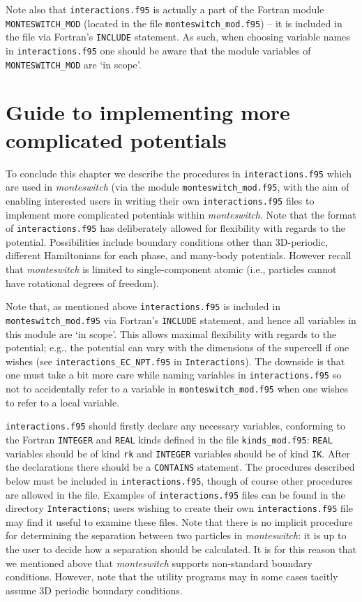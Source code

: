 \documentclass{report}
\begin{document}
Note also that \texttt{interactions.f95} is actually a part of the Fortran module \verb|MONTESWITCH_MOD| (located in the file 
\texttt{monteswitch\_mod.f95}) -- it is included in the file via Fortran's \verb|INCLUDE| statement. As such, when choosing variable names
in \texttt{interactions.f95} one should be aware that the module variables of \verb|MONTESWITCH_MOD| are `in scope'.


\section{Guide to implementing more complicated potentials}
To conclude this chapter we describe the procedures in \texttt{interactions.f95} which are used in \emph{monteswitch} (via the module
\texttt{monteswitch\_mod.f95}, with the aim of enabling interested users in writing their own \texttt{interactions.f95} files to implement
more complicated potentials within \emph{monteswitch}. Note that the format of \texttt{interactions.f95} has deliberately allowed for 
flexibility with regards to the potential. Possibilities include boundary conditions other than 3D-periodic, different Hamiltonians
for each phase, and many-body potentials. However recall that \emph{monteswitch} is limited to single-component atomic (i.e., particles
cannot have rotational degrees of freedom).

Note that, as mentioned above \texttt{interactions.f95} is included in \texttt{monteswitch\_mod.f95} via Fortran's \verb|INCLUDE| statement, and hence
all variables in this module are `in scope'. This allows maximal flexibility with regards to the potential; e.g., the potential can vary
with the dimensions of the supercell if one wishes (see \texttt{interactions\_EC\_NPT.f95} in \texttt{Interactions}). The downside is that one
must take a bit more care while naming variables in \texttt{interactions.f95} so not to accidentally refer to a variable in 
\texttt{monteswitch\_mod.f95} when one wishes to refer to a local variable. 

\texttt{interactions.f95} should firstly declare any necessary variables, conforming to the Fortran \verb|INTEGER| and \verb|REAL| kinds defined
in the file \texttt{kinds\_mod.f95}: \verb|REAL| variables should be of kind \verb|rk| and \verb|INTEGER| variables should be of kind \verb|IK|.
After the declarations there should be a \verb|CONTAINS| statement.
The procedures described below must be included in \texttt{interactions.f95}, though of course other procedures are allowed in the file.
Examples of \texttt{interactions.f95} files can be found in the directory \texttt{Interactions}; users wishing to create their own
\texttt{interactions.f95} file may find it useful to examine these files. 
Note that there is no implicit procedure for determining the separation between two particles in \emph{monteswitch}: it is up to the
user to decide how a separation should be calculated. It is for this reason that we mentioned above that \emph{monteswitch} supports non-standard
boundary conditions. However, note that the utility programs may in some cases tacitly assume 3D periodic boundary conditions. 
\end{document}
